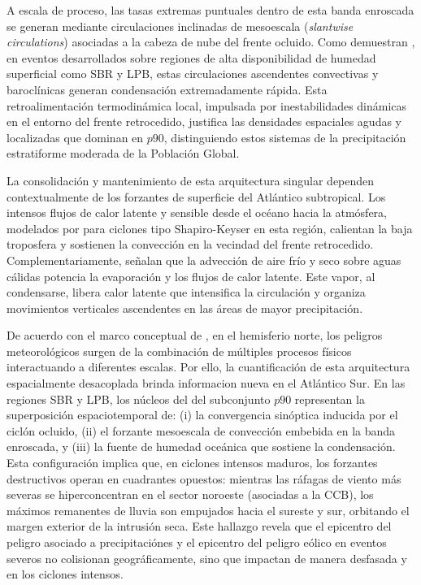 A escala de proceso, las tasas extremas puntuales dentro de esta banda enroscada se generan mediante circulaciones inclinadas de mesoescala (\textit{slantwise circulations}) asociadas a la cabeza de nube del frente ocluido. 
Como demuestran \citet{clark2005sting}, en eventos desarrollados sobre regiones de alta disponibilidad de humedad superficial como SBR y LPB, estas circulaciones ascendentes convectivas y baroclínicas generan condensación extremadamente rápida. 
Esta retroalimentación termodinámica local, impulsada por inestabilidades dinámicas en el entorno del frente retrocedido, justifica las densidades espaciales agudas y localizadas que dominan en $p90$, distinguiendo estos sistemas de la precipitación estratiforme moderada de la Población Global.

La consolidación y mantenimiento de esta arquitectura singular dependen contextualmente de los forzantes de superficie del Atlántico subtropical. 
Los intensos flujos de calor latente y sensible desde el océano hacia la atmósfera, modelados por \citet{gozzo2013air} para ciclones tipo Shapiro-Keyser en esta región, calientan la baja troposfera y sostienen la convección en la vecindad del frente retrocedido. 
Complementariamente,\citet{andrade2024composite} señalan que la advección de aire frío y seco sobre aguas cálidas potencia la evaporación y los flujos de calor latente. Este vapor, al condensarse, libera calor latente que intensifica la circulación y organiza movimientos verticales ascendentes en las áreas de mayor precipitación.

De acuerdo con el marco conceptual de \citet{zscheischler2018future}, en el hemisferio norte, los peligros meteorológicos surgen de la combinación de múltiples procesos físicos interactuando a diferentes escalas. 
Por ello, la cuantificación de esta arquitectura espacialmente desacoplada brinda informacion nueva en el Atlántico Sur. 
En las regiones SBR y LPB, los núcleos del del subconjunto $p90$ representan la superposición espaciotemporal de: 
(i) la convergencia sinóptica inducida por el ciclón ocluido, 
(ii) el forzante mesoescala de convección embebida en la banda enroscada, y 
(iii) la fuente de humedad oceánica que sostiene la condensación. 
Esta configuración implica que, en ciclones intensos maduros, los forzantes destructivos operan en cuadrantes opuestos: mientras las ráfagas de viento más severas se hiperconcentran en el sector noroeste (asociadas a la CCB), los máximos remanentes de lluvia son empujados hacia el sureste y sur, orbitando el margen exterior de la intrusión seca. 
Este hallazgo revela que el epicentro del peligro asociado a precipitaciónes y el epicentro del peligro eólico en eventos severos no colisionan geográficamente, sino que impactan de manera desfasada y en los ciclones intensos.


